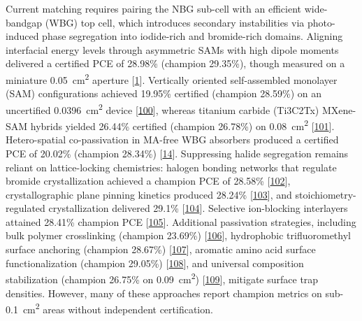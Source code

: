 \documentclass[
  11pt,
]{article}
\begin{document}
Current matching requires pairing the NBG sub-cell with an efficient
wide-bandgap (WBG) top cell, which introduces secondary instabilities
via photo-induced phase segregation into iodide-rich and bromide-rich
domains. Aligning interfacial energy levels through asymmetric SAMs with
high dipole moments delivered a certified PCE of 28.98\% (champion
29.35\%), though measured on a miniature
\qty{0.05}{\centi\meter\squared} aperture
{[}\href{https://doi.org/10.1002/adma.202523338}{1}{]}. Vertically
oriented self-assembled monolayer (SAM) configurations achieved 19.95\%
certified (champion 28.59\%) on an uncertified
\qty{0.0396}{\centi\meter\squared} device
{[}\href{https://doi.org/10.1002/adma.202521898}{100}{]}, whereas
titanium carbide (Ti3C2Tx) MXene-SAM hybrids yielded 26.44\% certified
(champion 26.78\%) on \qty{0.08}{\centi\meter\squared}
{[}\href{https://doi.org/10.1002/aenm.70966}{101}{]}. Hetero-spatial
co-passivation in MA-free WBG absorbers produced a certified PCE of
20.02\% (champion 28.34\%)
{[}\href{https://doi.org/10.1002/aenm.70755}{14}{]}. Suppressing halide
segregation remains reliant on lattice-locking chemistries: halogen
bonding networks that regulate bromide crystallization achieved a
champion PCE of 28.58\%
{[}\href{https://doi.org/10.1002/adfm.74659}{102}{]}, crystallographic
plane pinning kinetics produced 28.24\%
{[}\href{https://doi.org/10.1002/adfm.75395}{103}{]}, and
stoichiometry-regulated crystallization delivered 29.1\%
{[}\href{https://doi.org/10.1021/acsnano.6c04740}{104}{]}. Selective
ion-blocking interlayers attained 28.41\% champion PCE
{[}\href{https://doi.org/10.1002/aenm.202506634}{105}{]}. Additional
passivation strategies, including bulk polymer crosslinking (champion
23.69\%) {[}\href{https://doi.org/10.1002/smll.73404}{106}{]},
hydrophobic trifluoromethyl surface anchoring (champion 28.67\%)
{[}\href{https://doi.org/10.1002/aenm.70910}{107}{]}, aromatic amino
acid surface functionalization (champion 29.05\%)
{[}\href{https://doi.org/10.1002/smll.73595}{108}{]}, and universal
composition stabilization (champion 26.75\% on
\qty{0.09}{\centi\meter\squared})
{[}\href{https://doi.org/10.1002/adma.72986}{109}{]}, mitigate surface
trap densities. However, many of these approaches report champion
metrics on sub-\qty{0.1}{\centi\meter\squared} areas without independent
certification.
\end{document}
